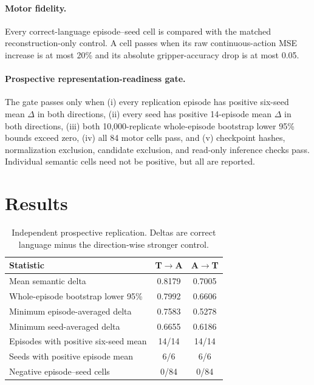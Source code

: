 \documentclass{article}
\begin{document}
\paragraph{Motor fidelity.}
Every correct-language episode--seed cell is compared with the matched
reconstruction-only control.  A cell passes when its raw continuous-action MSE
increase is at most 20\% and its absolute gripper-accuracy drop is at most
0.05.

\paragraph{Prospective representation-readiness gate.}
The gate passes only when (i) every replication episode has positive six-seed
mean $\Delta$ in both directions, (ii) every seed has positive 14-episode mean
$\Delta$ in both directions, (iii) both 10,000-replicate whole-episode
bootstrap lower 95\% bounds exceed zero, (iv) all 84 motor cells pass, and
(v) checkpoint hashes, normalization exclusion, candidate exclusion, and
read-only inference checks pass.  Individual semantic cells need not be
positive, but all are reported.

\section{Results}
\label{sec:results}

\begin{table}[t]
  \centering
  \caption{Independent prospective replication.  Deltas are correct language
  minus the direction-wise stronger control.}
  \label{tab:replication}
  \begin{tabular}{lcc}
    \toprule
    Statistic & T$\rightarrow$A & A$\rightarrow$T \\
    \midrule
    Mean semantic delta & 0.8179 & 0.7005 \\
    Whole-episode bootstrap lower 95\% & 0.7992 & 0.6606 \\
    Minimum episode-averaged delta & 0.7583 & 0.5278 \\
    Minimum seed-averaged delta & 0.6655 & 0.6186 \\
    Episodes with positive six-seed mean & 14/14 & 14/14 \\
    Seeds with positive episode mean & 6/6 & 6/6 \\
    Negative episode--seed cells & 0/84 & 0/84 \\
    \bottomrule
  \end{tabular}
\end{table}
\end{document}
